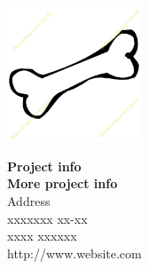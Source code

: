 {}
\thispagestyle{empty}

\begin{minipage}[t]{0.48\textwidth}
\vspace*{-25pt}			%
\includegraphics[height=4cm]{4.Construction/pictures/skeleton-logo.png}
\end{minipage}
\hfill
\begin{minipage}[t]{0.48\textwidth}
{\small 
\textbf{Project info}\\
\textbf{More project info}  \\
Address \\
xxxxxxx xx-xx \\
xxxx xxxxxx \\
http://www.website.com}
\end{minipage}

\vspace*{1cm}

